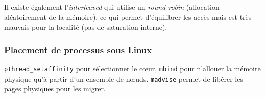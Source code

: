 \documentclass{article}
\begin{document}
Il existe également l'\emph{interleaved} qui utilise un \emph{round robin} (allocation aléatoirement de la mémoire), ce qui permet d'équilibrer les accès mais est très mauvais pour la localité (pas de saturation interne).

\subsubsection{Placement de processus sous Linux}
\texttt{pthread\_setaffinity} pour sélectionner le cœur, \texttt{mbind} pour n'allouer la mémoire physique qu'à partir d'un ensemble de nœuds. \texttt{madvise} permet de libérer les pages physiques pour les migrer.
\end{document}
